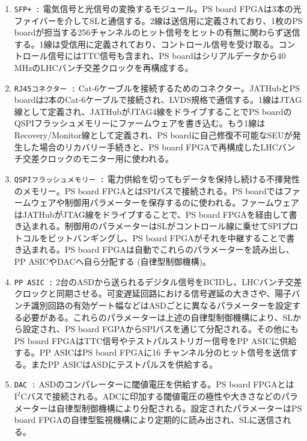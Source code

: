 \baselineskip

\begin{enumerate}
    \item \texttt{SFP+ :} 電気信号と光信号の変換するモジュール。PS board FPGAは3本の光ファイバーを介してSLと通信する。2線は送信用に定義されており、1枚のPS boardが担当する256チャンネルのヒット信号をヒットの有無に関わらず送信する。1線は受信用に定義されており、コントロール信号を受け取る。コントロール信号にはTTC信号も含まれ、PS boardはシリアルデータから40 MHzのLHCバンチ交差クロックを再構成する。
    \baselineskip

    \item \texttt{RJ45コネクター :} Cat-6ケーブルを接続するためのコネクター。JATHubとPS boardは2本のCat-6ケーブルで接続され、LVDS規格で通信する。1線はJTAG線として定義され、JATHubがJTAG4線をドライブすることでPS boardのQSPIフラッシュメモリーにファームウェアを書き込む。もう1線はRecovery/Monitor線として定義され、PS boardに自己修復不可能なSEUが発生した場合のリカバリー手続きと、PS board FPGAで再構成したLHCバンチ交差クロックのモニター用に使われる。
    \baselineskip

    \item \texttt{QSPIフラッシュメモリー :} 電力供給を切ってもデータを保持し続ける不揮発性のメモリー。PS board FPGAとはSPIバスで接続される。PS boardではファームウェアや制御用パラメーターを保存するのに使われる。ファームウェアはJATHubがJTAG線をドライブすることで、PS board FPGAを経由して書き込まれる。制御用のパラメーターはSLがコントロール線に乗せてSPIプロトコルをビットバンギングし、PS board FPGAがそれを中継することで書き込まれる。PS board FPGAは自動でこれらのパラメーターを読み出し、PP ASICやDACへ自ら分配する (自律型制御機構)。
    \baselineskip

    \item \texttt{PP ASIC :} 2台のASDから送られるデジタル信号をBCIDし、LHCバンチ交差クロックと同期させる。可変遅延回路における信号遅延の大きさや、陽子バンチ識別回路の有効ゲート幅などはASDごとに異なるパラメーターを設定する必要がある。これらのパラメーターは上述の自律型制御機構により、SLから設定され、PS board FGPAからSPIバスを通じて分配される。その他にもPS board FPGAはTTC信号やテストパルストリガー信号をPP ASICに供給する。PP ASICはPS board FPGAに16 チャンネル分のヒット信号を送信する。またPP ASICはASDにテストパルスを供給する。
    \baselineskip            

    \item \texttt{DAC :} ASDのコンパレーターに閾値電圧を供給する。PS board FPGAとは$\mathrm{I^{2}C}$バスで接続される。ADCに印加する閾値電圧の極性や大きさなどのパラメーターは自律型制御機構により分配される。設定されたパラメーターはPS board FPGAの自律型監視機構により定期的に読み出され、SLに送信される。
    \baselineskip


\end{enumerate}
